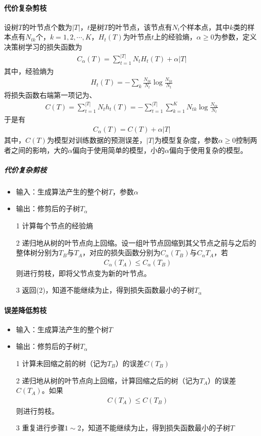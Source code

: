 \paragraph{代价复杂剪枝}设树$T$的叶节点个数为$|T|$，$t$是树$T$的叶节点，该节点有$N_t$个样本点，其中$k$类的样本点有$N_{tk}$个，$k=1,2,\cdots,K$，$H_t(T)$为叶节点$t$上的经验熵，$\alpha\geq 0$为参数，定义决策树学习的损失函数为
\begin{eqnarray}
C_\alpha(T)=\sum_{t=1}^{|T|} N_tH_t(T)+\alpha|T|
\end{eqnarray}
其中，经验熵为
\begin{eqnarray}
H_t(T)=-\sum_k\frac{N_{tk}}{N_t}\log\frac{N_{tk}}{N_t}
\end{eqnarray}
将损失函数右端第一项记为、
\begin{eqnarray}
C(T)=\sum_{t=1}^{|T|} N_th_t(T)=-\sum_{t=1}^{|T|}\sum_{k=1}^K N_{tk}\log\frac{N_{tk}}{N_t}
\end{eqnarray}
于是有
\begin{eqnarray}
C_\alpha(T)=C(T)+\alpha|T|
\end{eqnarray}
其中，$C(T)$为模型对训练数据的预测误差，$|T|$为模型复杂度，参数$\alpha\geq	 0$控制两者之间的影响，大的$\alpha$偏向于使用简单的模型，小的$\alpha$偏向于使用复杂的模型。
\subparagraph{代价复杂剪枝}
\begin{itemize}
\item 输入：生成算法产生的整个树$T$，参数$\alpha$
\item 输出：修剪后的子树$T_\alpha$
\item[1] 计算每个节点的经验熵
\item[2] 递归地从树的叶节点向上回缩。设一组叶节点回缩到其父节点之前与之后的整体树分别为$T_B$与$T_A$，对应的损失函数分别为$C_\alpha(T_B)$与$C_\alpha{T_A}$，若
\begin{eqnarray}
C_\alpha(T_A)\leq C_\alpha(T_B)
\end{eqnarray}
则进行剪枝，即将父节点变为新的叶节点。
\item[3] 返回(2)，知道不能继续为止，得到损失函数最小的子树$T_\alpha$
\end{itemize}
\paragraph{误差降低剪枝}
\begin{itemize}
\item 输入：生成算法产生的整个树$T$
\item 输出：修剪后的子树$T_\alpha$
\item[1] 计算未回缩之前的树（记为$T_B$）的误差$C(T_B)$
\item[2] 递归地从树的叶节点向上回缩，计算回缩之后的树（记为$T_A$）的误差$C(T_A)$。如果
\begin{eqnarray}
C(T_A)\leq C(T_B)
\end{eqnarray}
则进行剪枝。
\item[3] 重复进行步骤$1\sim 2$，知道不能继续为止，得到损失函数最小的子树$T$
\end{itemize}


